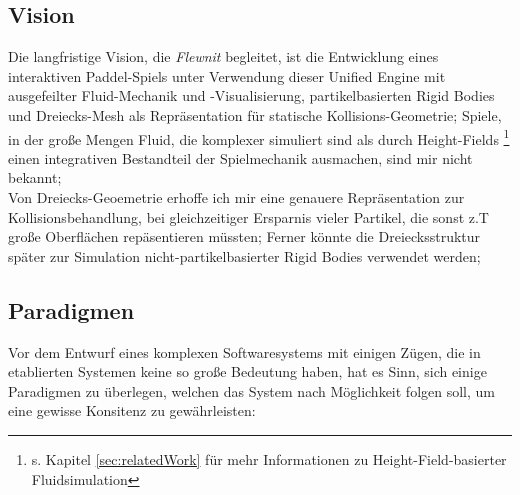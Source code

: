 
\subsection{Vision}

Die langfristige Vision, die \emph{Flewnit} begleitet, ist die Entwicklung eines interaktiven Paddel-Spiels unter Verwendung dieser Unified Engine mit ausgefeilter Fluid-Mechanik und -Visualisierung, partikelbasierten Rigid Bodies und Dreiecks-Mesh als Repräsentation für statische Kollisions-Geometrie; Spiele, in der große Mengen Fluid, die komplexer simuliert sind als durch Height-Fields
\footnote{s. Kapitel \ref{sec:relatedWork} für mehr Informationen zu Height-Field-basierter Fluidsimulation}
einen integrativen Bestandteil der Spielmechanik ausmachen, sind mir nicht bekannt;\\
Von Dreiecks-Geoemetrie erhoffe ich mir eine genauere Repräsentation zur Kollisionsbehandlung, bei gleichzeitiger Ersparnis vieler Partikel, die sonst z.T große Oberflächen repäsentieren müssten; Ferner könnte die Dreiecksstruktur später zur Simulation nicht-partikelbasierter Rigid Bodies verwendet werden;



\subsection{Paradigmen}
\label{sec:paradigm}

Vor dem Entwurf eines komplexen Softwaresystems mit einigen Zügen, die in etablierten Systemen keine so große Bedeutung haben, hat es Sinn, sich einige Paradigmen zu überlegen, welchen das System nach Möglichkeit folgen soll, um eine gewisse Konsitenz zu gewährleisten:
	
